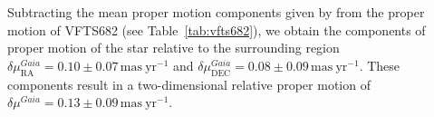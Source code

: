 \documentclass[apjl,twocolumn]{emulateapj}
\DeclareRobustCommand{\Figref}[1]{Fig.~\ref{#1}}
\DeclareRobustCommand{\Tabref}[1]{Table~\ref{#1}}
\DeclareRobustCommand{\Secref}[1]{Sec.~\ref{#1}}
\begin{document}
Subtracting the mean proper motion components given by
\citet{lennon:18} from the
proper motion of VFTS682 (see \Tabref{tab:vfts682}), we obtain the
components of proper motion of the star relative to the surrounding region
$\delta\mu_\mathrm{RA}^{Gaia} = 0.10 \pm 0.07\,\mathrm{mas\ yr^{-1}}$
and $\delta\mu_\mathrm{DEC}^{Gaia} = 0.08
\pm 0.09\,\mathrm{mas\ yr^{-1}}$. These components result in a
two-dimensional relative proper motion of $\delta \mu^{Gaia}=0.13\pm 0.09\,\mathrm{mas\
  yr^{-1}}$.



\end{document}
